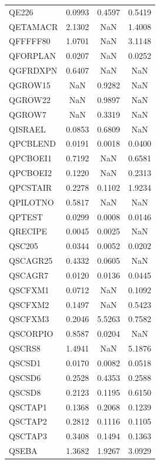 \begin{longtable}{lccc}
QE226    &   0.0993 &   0.4597 &   0.5419 \\
QETAMACR &   2.1302 &      NaN &   1.4008 \\
QFFFFF80 &   1.0701 &      NaN &   3.1148 \\
QFORPLAN &   0.0207 &      NaN &   0.0252 \\
QGFRDXPN &   0.6407 &      NaN &      NaN \\
QGROW15  &      NaN &   0.9282 &      NaN \\
QGROW22  &      NaN &   0.9897 &      NaN \\
QGROW7   &      NaN &   0.3319 &      NaN \\
QISRAEL  &   0.0853 &   0.6809 &      NaN \\
QPCBLEND &   0.0191 &   0.0018 &   0.0400 \\
QPCBOEI1 &   0.7192 &      NaN &   0.6581 \\
QPCBOEI2 &   0.1220 &      NaN &   0.2313 \\
QPCSTAIR &   0.2278 &   0.1102 &   1.9234 \\
QPILOTNO &   0.5817 &      NaN &      NaN \\
QPTEST   &   0.0299 &   0.0008 &   0.0146 \\
QRECIPE  &   0.0045 &   0.0025 &      NaN \\
QSC205   &   0.0344 &   0.0052 &   0.0202 \\
QSCAGR25 &   0.4332 &   0.0605 &      NaN \\
QSCAGR7  &   0.0120 &   0.0136 &   0.0445 \\
QSCFXM1  &   0.0712 &      NaN &   0.1092 \\
QSCFXM2  &   0.1497 &      NaN &   0.5423 \\
QSCFXM3  &   0.2046 &   5.5263 &   0.7582 \\
QSCORPIO &   0.8587 &   0.0204 &      NaN \\
QSCRS8   &   1.4941 &      NaN &   5.1876 \\
QSCSD1   &   0.0170 &   0.0082 &   0.0518 \\
QSCSD6   &   0.2528 &   0.4353 &   0.2588 \\
QSCSD8   &   0.2123 &   0.1195 &   0.6150 \\
QSCTAP1  &   0.1368 &   0.2068 &   0.1239 \\
QSCTAP2  &   0.2812 &   0.1116 &   0.1105 \\
QSCTAP3  &   0.3408 &   0.1494 &   0.1363 \\
QSEBA    &   1.3682 &   1.9267 &   3.0929 \\

\end{longtable}
